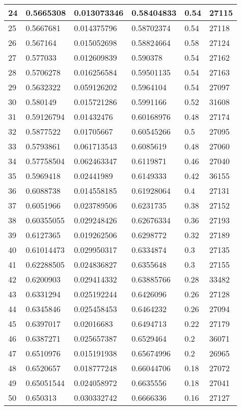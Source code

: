 \begin{longtable}{|l|l|l|l|l|l|}
24 & 0.5665308 & 0.013073346 & 0.58404833 & 0.54 & 27115 \\ \hline 
25 & 0.5667681 & 0.014375796 & 0.58702374 & 0.54 & 27118 \\ \hline 
26 & 0.567164 & 0.015052698 & 0.58824664 & 0.58 & 27124 \\ \hline 
27 & 0.577033 & 0.012609839 & 0.590378 & 0.54 & 27162 \\ \hline 
28 & 0.5706278 & 0.016256584 & 0.59501135 & 0.54 & 27163 \\ \hline 
29 & 0.5632322 & 0.059126202 & 0.5964104 & 0.54 & 27097 \\ \hline 
30 & 0.580149 & 0.015721286 & 0.5991166 & 0.52 & 31608 \\ \hline 
31 & 0.59126794 & 0.01432476 & 0.60168976 & 0.48 & 27174 \\ \hline 
32 & 0.5877522 & 0.01705667 & 0.60545266 & 0.5 & 27095 \\ \hline 
33 & 0.5793861 & 0.061713543 & 0.6085619 & 0.48 & 27060 \\ \hline 
34 & 0.57758504 & 0.062463347 & 0.6119871 & 0.46 & 27040 \\ \hline 
35 & 0.5969418 & 0.02441989 & 0.6149333 & 0.42 & 36155 \\ \hline 
36 & 0.6088738 & 0.014558185 & 0.61928064 & 0.4 & 27131 \\ \hline 
37 & 0.6051966 & 0.023789506 & 0.6231735 & 0.38 & 27152 \\ \hline 
38 & 0.60355055 & 0.029248426 & 0.62676334 & 0.36 & 27193 \\ \hline 
39 & 0.6127365 & 0.019262506 & 0.6298772 & 0.32 & 27189 \\ \hline 
40 & 0.61014473 & 0.029950317 & 0.6334874 & 0.3 & 27135 \\ \hline 
41 & 0.62288505 & 0.024836827 & 0.6355648 & 0.3 & 27155 \\ \hline 
42 & 0.6200903 & 0.029414332 & 0.63885766 & 0.28 & 33482 \\ \hline 
43 & 0.6331294 & 0.025192244 & 0.6426096 & 0.26 & 27128 \\ \hline 
44 & 0.6345846 & 0.025458453 & 0.6464232 & 0.26 & 27094 \\ \hline 
45 & 0.6397017 & 0.02016683 & 0.6494713 & 0.22 & 27179 \\ \hline 
46 & 0.6387271 & 0.025657387 & 0.6529464 & 0.2 & 36071 \\ \hline 
47 & 0.6510976 & 0.015191938 & 0.65674996 & 0.2 & 26965 \\ \hline 
48 & 0.6520657 & 0.018777248 & 0.66044706 & 0.18 & 27072 \\ \hline 
49 & 0.65051544 & 0.024058972 & 0.6635556 & 0.18 & 27041 \\ \hline 
50 & 0.650313 & 0.030332742 & 0.6666336 & 0.16 & 27127 \\ \hline 
\end{longtable}